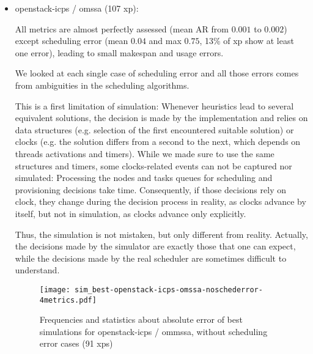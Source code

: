 \begin{itemize}
 \item openstack-icps / omssa (107 xp): 
 
      
 
      All metrics are almost perfectly assessed (mean AR from $0.001$ to $0.002$)
      except scheduling error 
      (mean $0.04$ and max $0.75$, 13\% of xp show at least one error), 
      leading to small makespan and usage errors. 
      
      We looked at each single case of scheduling error and all those errors 
      comes from ambiguities in the scheduling algorithms.
      
      This is a first limitation of simulation:
      Whenever heuristics lead to several equivalent solutions, 
      the decision is made by the implementation and relies on data structures 
      (e.g. selection of the first encountered suitable solution) or clocks 
      (e.g. the solution differs from a second to the next, which depends 
      on threads activations and timers). While we made sure to use the same 
      structures and timers, some clocks-related events can not be captured nor 
      simulated: Processing the nodes and tasks queues for scheduling and 
      provisioning decisions take time. Consequently, if those decisions rely on
      clock, they change during the decision process in reality, as clocks advance 
      by itself, but not in simulation, as clocks advance only explicitly.
      
      Thus, the simulation is not mistaken, but only different from reality.
      Actually, the decisions made by the simulator are exactly those that one 
      can expect, while the decisions made by the real scheduler are sometimes
      difficult to understand.

      
\begin{figure}  
  \texttt{[image: sim\_best-openstack-icps-omssa-noschederror-4metrics.pdf]}

  
      
  

\caption{Frequencies and statistics about absolute error of best simulations for openstack-icps / 
ommssa, without scheduling error cases (91 xps)}
\end{figure}       


\end{itemize}
